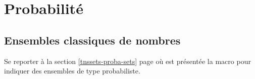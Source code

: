\documentclass[12pt,a4paper]{article}
\begin{document}
\chapter{Probabilité}

\section{Ensembles classiques de nombres}

Se reporter à la section
\ref{tnssets-proba-sets} page \pageref{tnssets-proba-sets}
où est présentée la  macro  pour indiquer des ensembles de type probabiliste.
\end{document}
